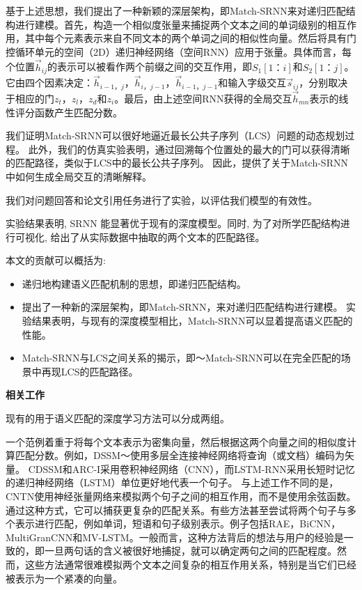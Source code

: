 基于上述思想，我们提出了一种新颖的深层架构，即Match-SRNN来对递归匹配结构进行建模。首先，构造一个相似度张量来捕捉两个文本之间的单词级别的相互作用，其中每个元素表示来自不同文本的两个单词之间的相似性向量。然后将具有门控循环单元的空间（2D）递归神经网络（空间RNN）应用于张量。具体而言，每个位置$ \vec {h} _ {ij} $的表示可以被看作两个前缀之间的交互作用，即$ {S_1 [1 {：} i]} $和$ {S_2 [1 { ：} j]} $。它由四个因素决定：$ \vec {h} _ {i-1，j}，\vec {h} _ {i，j-1}，\vec {h} _ {i-1，j-1 } $和输入字级交互$ \vec {s} _ {ij} $，分别取决于相应的门$ z_t，z_l，z_d $和$ z_i $。最后，由上述空间RNN获得的全局交互$ \vec {h} _ {mn} $表示的线性评分函数产生匹配分数。

我们证明Match-SRNN可以很好地逼近最长公共子序列（LCS）问题的动态规划过程。 此外，我们的仿真实验表明，通过回溯每个位置处的最大的门可以获得清晰的匹配路径，类似于LCS中的最长公共子序列。 因此，提供了关于Match-SRNN中如何生成全局交互的清晰解释。

我们对问题回答和论文引用任务进行了实验，以评估我们模型的有效性。

实验结果表明, SRNN 能显著优于现有的深度模型。同时, 为了对所学匹配结构进行可视化, 给出了从实际数据中抽取的两个文本的匹配路径。

本文的贡献可以概括为:
\begin{itemize}
\item 递归地构建语义匹配机制的思想，即递归匹配结构。
\item 提出了一种新的深层架构，即Match-SRNN，来对递归匹配结构进行建模。 实验结果表明，与现有的深度模型相比，Match-SRNN可以显着提高语义匹配的性能。
\item Match-SRNN与LCS之间关系的揭示，即〜Match-SRNN可以在完全匹配的场景中再现LCS的匹配路径。
\end{itemize}

\textbf{相关工作}

现有的用于语义匹配的深度学习方法可以分成两组。

一个范例着重于将每个文本表示为密集向量，然后根据这两个向量之间的相似度计算匹配分数。例如，DSSM〜\cite {huang2013learning}使用多层全连接神经网络将查询（或文档）编码为矢量。
CDSSM和ARC-I采用卷积神经网络（CNN），而LSTM-RNN采用长短时记忆的递归神经网络（LSTM）单位更好地代表一个句子。
与上述工作不同的是，CNTN使用神经张量网络来模拟两个句子之间的相互作用，而不是使用余弦函数。通过这种方式，它可以捕获更复杂的匹配关系。有些方法甚至尝试将两个句子与多个表示进行匹配，例如单词，短语和句子级别表示。例子包括RAE，BiCNN，MultiGranCNN和MV-LSTM。一般而言，这种方法背后的想法与用户的经验是一致的，即一旦两句话的含义被很好地捕捉，就可以确定两句之间的匹配程度。然而，这些方法通常很难模拟两个文本之间复杂的相互作用关系，特别是当它们已经被表示为一个紧凑的向量。

